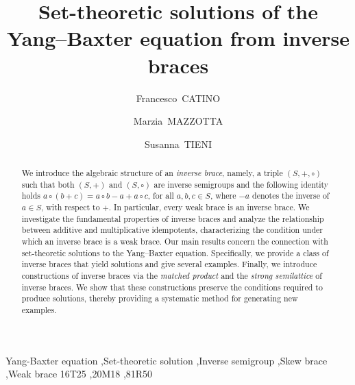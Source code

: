 \documentclass[preprint,1p]{elsarticle}
\theoremstyle{definition}               %
\begin{document}
\let\today\relax %


\begin{frontmatter}


 	\title{Set-theoretic solutions of the Yang--Baxter equation from inverse braces}
	 



	

    \author {Francesco~CATINO}
	\author {Marzia~MAZZOTTA}
	\author{Susanna~TIENI}
\address{Department of Mathemathics and Physics ``Ennio De Giorgi", University of Salento\\
	Via Provinciale Lecce-Arnesano, 73100, Lecce (Italy)}

	\begin{abstract}
We introduce the algebraic structure of an \emph{inverse brace}, namely, a triple $(S,+,\circ)$ such that both $(S,+)$ and $(S,\circ)$ are inverse semigroups and the following identity holds
$a\circ(b+c)=a\circ b-a+a\circ c$,
for all $ a, b, c \in S$, where $-a$ denotes the inverse of $a \in S$, with respect to $+$. In particular, every weak brace is an inverse brace. We investigate the fundamental properties of inverse braces and analyze the relationship between additive and multiplicative idempotents, characterizing the condition under which an inverse brace is a weak brace. Our main results concern the connection with set-theoretic solutions to the Yang--Baxter equation. Specifically, we provide a class of inverse braces that yield solutions and give several examples.
Finally, we introduce constructions of inverse braces via the \emph{matched product} and the \emph{strong semilattice} of inverse braces. We show that these constructions preserve the conditions required to produce solutions, thereby providing a systematic method for generating new examples.

\end{abstract} 
	
	\begin{keyword}
		Yang-Baxter equation \sep Set-theoretic solution \sep Inverse semigroup \sep Skew brace \sep Weak brace 
		\MSC[2020] 16T25 \sep 20M18 \sep 81R50 
	\end{keyword}

\end{frontmatter}
\end{document}

